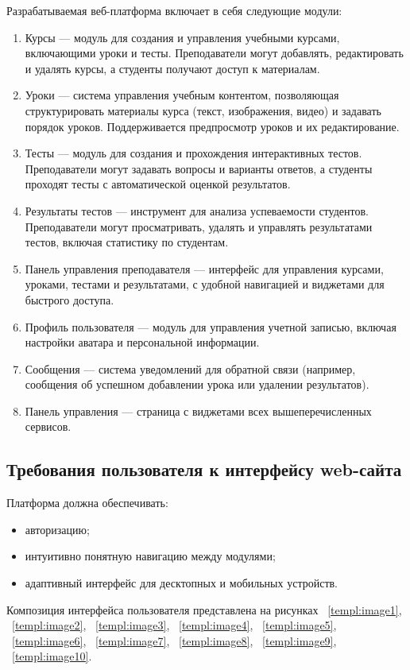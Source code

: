 Разрабатываемая веб-платформа включает в себя следующие модули:
\begin{enumerate}
\item {Курсы} — модуль для создания и управления учебными курсами, включающими уроки и тесты. Преподаватели могут добавлять, редактировать и удалять курсы, а студенты получают доступ к материалам.
\item {Уроки} — система управления учебным контентом, позволяющая структурировать материалы курса (текст, изображения, видео) и задавать порядок уроков. Поддерживается предпросмотр уроков и их редактирование.
\item {Тесты} — модуль для создания и прохождения интерактивных тестов. Преподаватели могут задавать вопросы и варианты ответов, а студенты проходят тесты с автоматической оценкой результатов.
\item {Результаты тестов} — инструмент для анализа успеваемости студентов. Преподаватели могут просматривать, удалять и управлять результатами тестов, включая статистику по студентам.
\item {Панель управления преподавателя} — интерфейс для управления курсами, уроками, тестами и результатами, с удобной навигацией и виджетами для быстрого доступа.
\item {Профиль пользователя} — модуль для управления учетной записью, включая настройки аватара и персональной информации.
\item {Сообщения} — система уведомлений для обратной связи (например, сообщения об успешном добавлении урока или удалении результатов).
\item {Панель управления} — страница с виджетами всех вышеперечисленных сервисов.
\end{enumerate}

\subsection{Требования пользователя к интерфейсу web-сайта}

Платформа должна обеспечивать:
\begin{itemize}
    \item авторизацию;
    \item интуитивно понятную навигацию между модулями;
    \item адаптивный интерфейс для десктопных и мобильных устройств.
\end{itemize}

Композиция интерфейса пользователя представлена на рисунках ~\ref{templ:image1}, ~\ref{templ:image2}, ~\ref{templ:image3}, ~\ref{templ:image4}, ~\ref{templ:image5}, ~\ref{templ:image6}, ~\ref{templ:image7}, ~\ref{templ:image8}, ~\ref{templ:image9},  ~\ref{templ:image10}.
\newpage  

